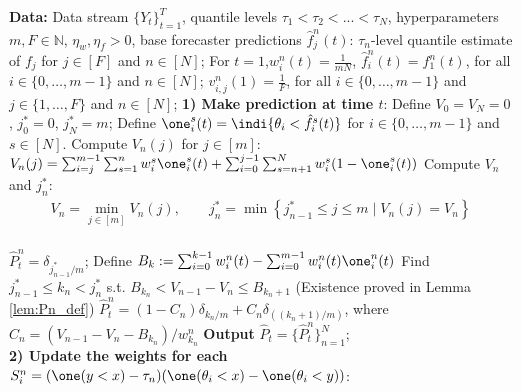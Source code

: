 
\begin{algorithm}
    \caption{Two-player game based multiple quantile level online omniprediction} \label{alg:omni-twoplayer_online_multi_q}
    \begin{algorithmic}[1]
    \State \textbf{Data:} Data stream $\{Y_t\}_{t=1}^T$, quantile levels $\tau_1 < \tau_2 < ... < \tau_N$, hyperparameters $m, F \in \mathbb{N}$, $\eta_w, \eta_f > 0$, base forecaster predictions $\hat{f}_j^n(t)$: $\tau_n$-level quantile estimate of $f_j$ for $j \in [F]$ and $n \in [N]$;
    \State For $t=1$,$w_i^n(t) = \frac{1}{mN}$, $\hat{f}_i^n(t) = f_1^n(t)$, for all $i \in \{0, \ldots, m-1\}$ and $n \in [N]$;
    \State $v_{i,j}^n(1) = \frac{1}{F}$, for all $i \in \{0, \ldots, m-1\}$ and $j \in \{1, \ldots, F\}$ and $n \in [N]$;
      \State \textbf{1) Make prediction at time $t$}:
        \State Define $V_0 = V_N = 0$, $j_0^* = 0$, $j_N^* = m$;
        \State Define $\one_i^s(t) = \indi{\theta_i < \hat{f}_i^s(t)}$ for $i \in \{0, \ldots, m-1\}$ and $s \in [N]$.
        \State Compute $V_n(j)$ for $j \in [m]$:
          \(
          V_n(j) = \sum_{i=j}^{m-1} \sum_{s=1}^{n} w_i^s \one_i^s(t) + \sum_{i=0}^{j-1} \sum_{s=n+1}^{N}  w_i^s (1 - \one_i^s(t))
          \)
        \State Compute $V_n$ and $j_n^*$:
          \begin{align*}
            V_n = \min_{j \in [m]} V_n(j), \qquad
            j_n^* = \min\left\{j_{n-1}^* \leq j \leq m \mid V_n(j) = V_n \right\}
          \end{align*}
        \EndFor \vspace{-0.2cm}\\
            \State $\hat{P}_t^n = \delta_{j_{n-1}^*/m}$;
          \Else
            \State Define $B_k := \sum_{i=0}^{k-1} w_i^n(t) - \sum_{i=0}^{m-1}w_i^n(t) \one_i^n(t)$
            \State Find $j_{n-1}^* \leq k_n < j_n^*$ s.t. $B_{k_n} < V_{n-1} - V_n \leq B_{k_n+1}$ (Existence proved in Lemma \ref{lem:Pn_def})
            \State $\hat{P}_t^n = (1-C_n)\delta_{k_n/m} + C_n\delta_{((k_n+1)/m)}$, where $C_n = \left( V_{n-1} - V_n - B_{k_n} \right) / w_{k_n}^n$
          \EndIf
        \EndFor
        \State \textbf{Output} $\hat{P}_t = \{\hat{P}_t^n\}_{n=1}^N$;  \vspace{-0.1cm}\\
        \State \textbf{2) Update the weights for each $S_{i}^n = (\one(y<x)-\tau_n)(\one(\theta_i<x)-\one(\theta_i<y))$}:

\end{algorithmic}
\end{algorithm}
